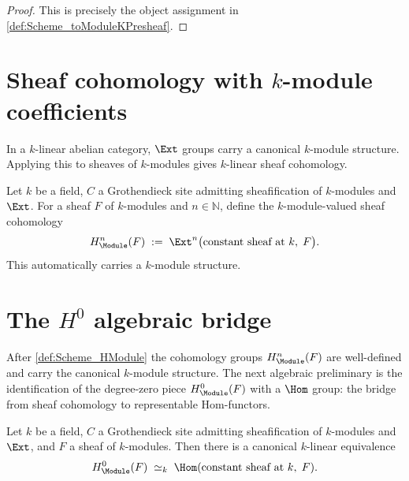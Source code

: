 \begin{proof}

  \leanok
  This is precisely the object assignment in \cref{def:Scheme_toModuleKPresheaf}.
\end{proof}

\section{Sheaf cohomology with \(k\)-module coefficients}
\label{sec:HModule}

In a \(k\)-linear abelian category, \(\Ext\) groups carry a canonical \(k\)-module structure. Applying this to sheaves of \(k\)-modules gives \(k\)-linear sheaf cohomology.

\begin{definition}\leanok
  \label{def:Scheme_HModule}

  Let \(k\) be a field, \(C\) a Grothendieck site admitting sheafification of \(k\)-modules and \(\Ext\). For a sheaf \(F\) of \(k\)-modules and \(n \in \mathbb N\), define the \(k\)-module-valued sheaf cohomology
  \[
    H^n_{\Module}(F) \;:=\; \Ext^n\bigl(\text{constant sheaf at }k,\; F\bigr).
  \]
  This automatically carries a \(k\)-module structure.
\end{definition}

\section{The \(H^0\) algebraic bridge}
\label{sec:HModule_zero}

After \cref{def:Scheme_HModule} the cohomology groups \(H^n_{\Module}(F)\) are well-defined and carry the canonical \(k\)-module structure. The next algebraic preliminary is the identification of the degree-zero piece \(H^0_{\Module}(F)\) with a \(\Hom\) group: the bridge from sheaf cohomology to representable Hom-functors.

\begin{definition}\leanok
  \label{def:Scheme_HModule_zero_linearEquiv}

  Let \(k\) be a field, \(C\) a Grothendieck site admitting sheafification of \(k\)-modules and \(\Ext\), and \(F\) a sheaf of \(k\)-modules. Then there is a canonical \(k\)-linear equivalence
  \[
    H^0_{\Module}(F) \;\simeq_k\; \Hom(\text{constant sheaf at }k,\; F).
  \]
\end{definition}

